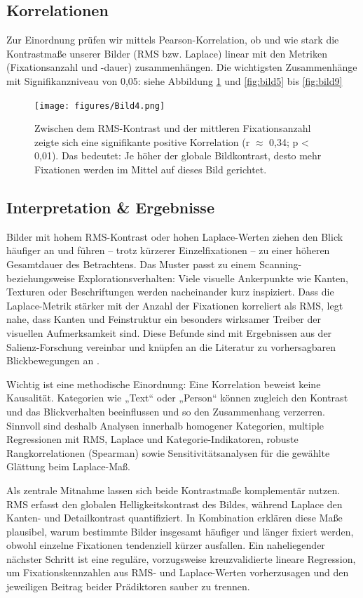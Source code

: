 \documentclass[
    language=german, %
    thesis=seminar, %
    supervisor=postdoc, %
    multiauthor=true, %
    ]{settings/csssa-thesis}
\begin{document}
\subsection{Korrelationen}
Zur Einordnung prüfen wir mittels Pearson-Korrelation, ob und wie stark die Kontrastma{\ss}e unserer Bilder (RMS bzw. Laplace) linear mit den Metriken (Fixationsanzahl und -dauer) zusammenhängen.
Die wichtigsten Zusammenhänge mit Signifikanzniveau von 0,05:
siehe Abbildung \ref{fig:bild4} und \ref{fig:bild5} bis \ref{fig:bild9}

\begin{figure}[h]
    \centering
    \texttt{[image: figures/Bild4.png]}
    \caption{
          Zwischen dem RMS-Kontrast und der mittleren Fixationsanzahl zeigte sich eine signifikante positive Korrelation (r $\approx$ 0,34; p < 0,01). Das bedeutet: Je höher der globale Bildkontrast, desto mehr Fixationen werden im Mittel auf dieses Bild gerichtet.
}\label{fig:bild4}
\end{figure}

\subsection{Interpretation \& Ergebnisse}
Bilder mit hohem RMS-Kontrast oder hohen Laplace-Werten ziehen den Blick häufiger an und führen 
– trotz kürzerer Einzel­fixationen – zu einer höheren Gesamtdauer des Betrachtens. 
Das Muster passt zu einem Scanning- beziehungsweise Explorationsverhalten: 
Viele visuelle Ankerpunkte wie Kanten, Texturen oder Beschriftungen werden nacheinander kurz inspiziert. 
Dass die Laplace-Metrik stärker mit der Anzahl der Fixationen korreliert als RMS, legt nahe, 
dass Kanten und Feinstruktur ein besonders wirksamer Treiber der visuellen Aufmerksamkeit sind. 
Diese Befunde sind mit Ergebnissen aus der Salienz-Forschung vereinbar und knüpfen 
an die Literatur zu vorhersagbaren Blickbewegungen an \citep{Foulsham2008}. 

Wichtig ist eine methodische Einordnung: Eine Korrelation beweist keine Kausalität. Kategorien wie „Text“ oder „Person“ können zugleich den Kontrast und das Blickverhalten beeinflussen und so den Zusammenhang verzerren. Sinnvoll sind deshalb Analysen innerhalb homogener Kategorien, multiple Regressionen mit RMS, Laplace und Kategorie-Indikatoren, robuste Rangkorrelationen (Spearman) sowie Sensitivitätsanalysen für die gewählte Glättung beim Laplace-Ma{\ss}. 

Als zentrale Mitnahme lassen sich beide Kontrastma{\ss}e komplementär nutzen. RMS erfasst den globalen Helligkeitskontrast des Bildes, während Laplace den Kanten- und Detailkontrast quantifiziert. In Kombination erklären diese Ma{\ss}e plausibel, warum bestimmte Bilder insgesamt häufiger und länger fixiert werden, obwohl einzelne Fixationen tendenziell kürzer ausfallen. Ein naheliegender nächster Schritt ist eine reguläre, vorzugsweise kreuzvalidierte lineare Regression, um Fixationskennzahlen aus RMS- und Laplace-Werten vorherzusagen und den jeweiligen Beitrag beider Prädiktoren sauber zu trennen.
\end{document}
